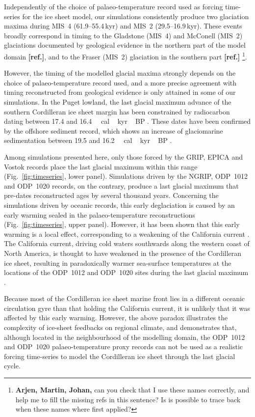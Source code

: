 \documentclass[tc, manuscript]{copernicus}
\newcommand{\aref}[0]{\textbf{[ref.]}}
\begin{document}
Independently of the choice of palaeo-temperature record used as forcing
time-series for the ice sheet model, our simulations consistently produce two
glaciation maxima during MIS~4 (61.9--55.4\,kyr) and MIS~2
(29.5--16.9\,kyr). These events broadly correspond in timing to the
Gladstone (MIS~4) and McConell (MIS~2) glaciations documented by geological
evidence in the northern part of the model domain \aref, and to the Fraser
(MIS~2) glaciation in the southern part \aref
\footnote{\textbf{Arjen, Martin, Johan,} can you check that I use these names
    correctly, and help me to fill the missing refs in this sentence? Is is
    possible to trace back when these names where first applied?}.

However, the timing of the modelled glacial maxima strongly depends on the
choice of palaeo-temperature record used, and a more precise agreement with
timing reconstructed from geological evidence is only attained in some of our
simulations. In the Puget lowland, the last glacial maximum advance of the
southern Cordilleran ice sheet margin has been constrained by radiocarbon
dating between 17.4 and 16.4\,\unit{\,cal\,kyr\,BP}
\citep[Fig.~4]{Porter.Swanson.1998}.
These dates have been confirmed by the offshore sediment record, which shows an
increase of glaciomarine sedimentation between 19.5 and
16.2\,\unit{\,cal\,kyr\,BP} \citep{Cosma.etal.2008}.

Among simulations presented here, only those forced by the GRIP, EPICA and
Vostok records place the last glacial maximum within this range
(Fig.~\ref{fig:timeseries}, lower panel). Simulations driven by the NGRIP,
ODP~1012 and ODP~1020 records, on the contrary, produce a last glacial maximum
that pre-dates reconstructed ages by several thousand years. Concerning the
simulations driven by oceanic records, this early deglaciation is caused by an
early warming sealed in the palaeo-temperature reconstructions
(Fig.~\ref{fig:timeseries}, upper panel). However, it has been shown that this
early warming is a local effect, corresponding to a weakening of the California
current \citep[Fig.~3]{Herbert.etal.2001}. The California current, driving cold
waters southwards
along the western coast of North America, is thought to have weakened in the
presence of the Cordilleran ice sheet, resulting in paradoxically warmer
sea-surface temperatures at the locations of the ODP~1012 and ODP~1020 sites
during the last glacial maximum \citep{Herbert.etal.2001}.

Because most of the Cordilleran ice sheet marine front lies in a different
oceanic circulation gyre than that holding the California current, it is
unlikely that it was affected by this early warming. However, the above paradox
illustrates the complexity of ice-sheet feedbacks on regional climate, and
demonstrates that, although located in the neighbourhood of the modelling
domain, the ODP~1012 and ODP~1020 palaeo-temperature proxy records can not be
used as a realistic forcing time-series to model the Cordilleran ice sheet
through the last glacial cycle.
\end{document}
